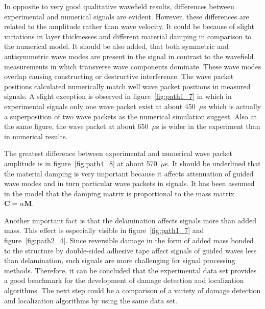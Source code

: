 In opposite to very good qualitative wavefield results, differences between experimental and numerical signals are evident. However, these differences are related to the amplitude rather than wave velocity. It could be because of slight variations in layer thicknesses and different material damping in comparison to the numerical model. It should be also added, that both symmetric and antisymmetric wave modes are present in the signal in contrast to the wavefield measurements in which transverse wave components dominate. These wave modes overlap causing constructing or destructive interference. The wave packet positions calculated numerically match well wave packet positions in measured signals. A slight exception is observed in figure~\ref{fig:path1_7} in which in experimental signals only one wave packet exist at about 450~\(\mu\)s which is actually a superposition of two wave packets as the numerical simulation suggest. Also at the same figure, the wave packet at about 650~\(\mu\)s is wider in the experiment than in numerical results. 

The greatest difference between experimental and numerical wave packet amplitude is in figure~\ref{fig:path4_8} at about 570~\(\mu\)s.   It should be underlined that the material damping is very important because it affects attenuation of guided wave modes and in turn particular wave packets in signals. It has been assumed in the model that the damping matrix is proportional to the mass matrix \(\bm{C} = \alpha \bm{M}\).
 

Another important fact is that the delamination affects signals more than added mass. This effect is especially visible in figure~\ref{fig:path1_7} and figure~\ref{fig:path2_4}. Since reversible damage in the form of added mass bonded to the structure by double-sided adhesive tape affect signals of guided waves less than delamination, such signals are more challenging for signal processing methods. Therefore, it can be concluded that the experimental data set provides a good benchmark for the development of damage detection and localization algorithms. The next step could be a comparison of a variety of damage detection and localization algorithms by using the same data set.

